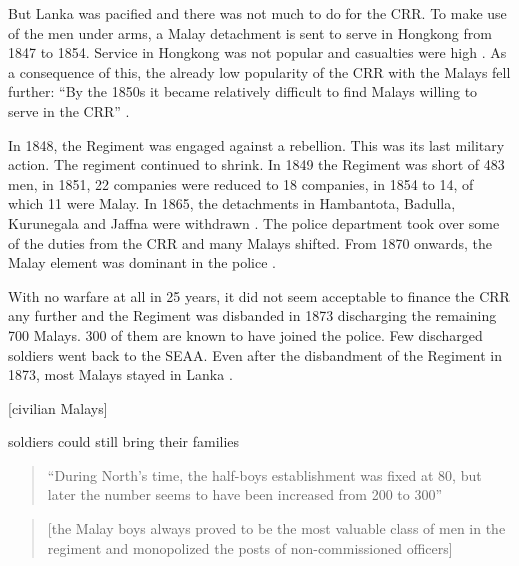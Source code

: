 But Lanka was pacified and there was not much to do for the CRR.
To make use of the men under arms,  a Malay detachment is sent to
serve in Hongkong from 1847 to 1854. Service in Hongkong was not
popular and casualties were high \citep[99]{Hussainmiya1990}. As a
consequence of this, the already low popularity of the CRR with
the Malays fell further: ``By the 1850s it became relatively
difficult to find Malays willing to serve in the CRR''
\citep[88]{Hussainmiya1990}.

In 1848, the Regiment was engaged against a rebellion. This was its last military action. The regiment continued to shrink. In 1849 the Regiment was short of 483 men, in 1851, 22 companies were reduced to 18 companies, in 1854 to 14, of which 11 were Malay. In 1865, the detachments in Hambantota, Badulla, Kurunegala and Jaffna were withdrawn \citep[101]{Hussainmiya1990}. The police department took over some of the duties from the CRR and many Malays shifted. From 1870 onwards, the Malay element was dominant in the police \citep[102f.]{Hussainmiya1990}.

With no warfare at all in 25 years, it did not seem acceptable to finance the CRR any further and the Regiment was disbanded in 1873 discharging the remaining 700 Malays. 300 of them are known to have joined the police.
Few discharged soldiers went back to the SEAA. Even after the disbandment of the Regiment in 1873, most Malays stayed in Lanka \citep[96]{Hussainmiya1990}.

[civilian Malays]

soldiers could still bring their families

\begin{quote}
    ``During North's time, the half-boys establishment was fixed at 80, but later the number seems to have been increased from 200 to 300''\citep[97]{Hussainmiya1990}
\end{quote}


\begin{quote}
    [the Malay boys always proved to be the most valuable class of men in the regiment and monopolized the posts of non-commissioned officers]\citep[97]{Hussainmiya1990}
\end{quote}







